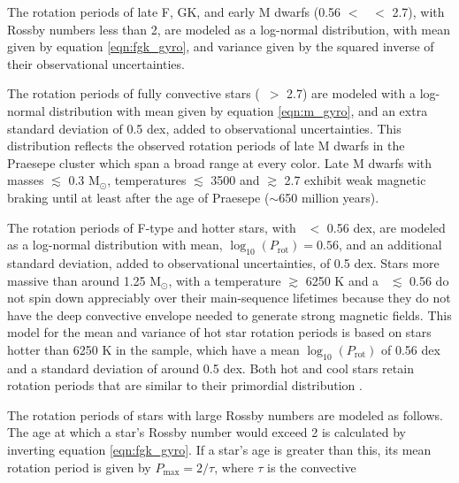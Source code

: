 \begin{itemize}
    \item{The rotation periods of late F, GK, and early M dwarfs
        (0.56 $<$ \gcolor\ $<$ 2.7), with Rossby numbers less than 2, are
        modeled as a log-normal distribution, with mean given by equation
        \ref{eqn:fgk_gyro}, and variance given by the squared inverse of their
        observational uncertainties.}
    \item{The rotation periods of fully convective stars (\gcolor\ $>$ 2.7)
        are modeled with a log-normal distribution with mean given by equation
        \ref{eqn:m_gyro}, and an extra standard deviation of
        0.5 dex, added to observational uncertainties.
        This distribution reflects the observed rotation periods of late M
        dwarfs in the Praesepe cluster which span a broad range at every
        color.
        Late M dwarfs with masses $\lesssim$ 0.3 M$_\odot$, temperatures
        $\lesssim$ 3500 and \gcolor $\gtrsim$ 2.7 exhibit weak magnetic
        braking until at least after the age of Praesepe ($\sim$650 million
        years).
    \item{The rotation periods of F-type and hotter stars, with \gcolor\ $<$
        0.56 dex, are modeled as a log-normal distribution with mean,
        $\log_{10}(P_\mathrm{rot})=0.56$,
        and an additional standard deviation, added to observational
        uncertainties, of 0.5 dex.
        Stars more massive than around 1.25 M$_\odot$, with a temperature
        $\gtrsim$ 6250 K and a \gcolor\ $\lesssim$ 0.56 do not spin down
        appreciably over their main-sequence lifetimes because they do not
        have the deep convective envelope needed to generate strong magnetic
        fields.
        This model for the mean and variance of hot star rotation periods is
        based on stars hotter than 6250 K in the \citet{mcquillan2014} sample,
        which have a mean $\log_{10}(P_\mathrm{rot})$ of 0.56 dex and a
        standard deviation of around 0.5 dex.}
        Both hot and cool stars retain rotation periods that are similar to
        their primordial distribution \citep[see \eg][]{matt2012,
        somers2017}.}
    \item{The rotation periods of stars with large Rossby numbers are
        modeled as follows.
        The age at which a star's Rossby number would exceed 2 is calculated
        by inverting equation \ref{eqn:fgk_gyro}.
        If a star's age is greater than this, its mean rotation period is
        given by $P_\mathrm{max} = 2/\tau$, where $\tau$ is the convective
}
\end{itemize}
